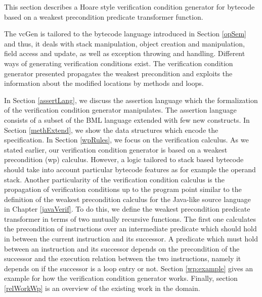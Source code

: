 
This section describes a Hoare style verification condition generator for bytecode based on a weakest precondition predicate transformer function.
 

The vcGen is tailored to the bytecode language introduced in Section \ref{opSem} and thus, it deals
with stack manipulation, object creation and manipulation, field access and update, as well as exception throwing and handling.
Different ways of generating verification conditions exist. The verification condition
 generator presented  propagates the weakest precondition and exploits the information 
about the modified locations by methods and loops. 

In Section \ref{assertLang}, we discuss the assertion language which the  formalization of 
the verification condition generator manipulates. The assertion language consists of a subset of the BML language 
extended with few new constructs.
In Section \ref{methExtend}, we show the data structures which encode the specification. 
In Section  \ref{wpRules}, we focus on the verification calculus.
As we stated earlier, our verification condition generator is based on a weakest precondition (wp) calculus.
 However, a logic tailored to stack based bytecode should take into account 
particular bytecode features as for example the operand stack. Another particularity of the verification condition calculus 
is the propagation of verification conditions up to the program point similar to the definition of the weakest precondition calculus
for the Java-like  source language in Chapter \ref{javaVerif}. To do this, we define the  weakest precondition predicate transformer
in terms of two mutually recursive functions. 
The first one calculates the precondition of instructions over an intermediate predicate which should hold 
in between the current instruction and 
its successor. A predicate which must hold between an instruction and its successor 
depends on the precondition of the successor and the execution relation between the two instructions, namely 
it depends on if the successor is a loop entry or not.
Section \ref{wp:example} gives an example for how the verification condition generator works.
Finally, section \ref{relWorkWp} is an overview of the existing work in the domain.
 





 
